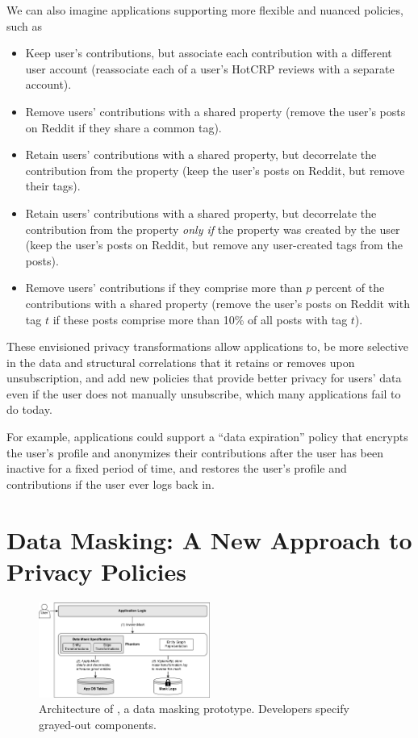We can also imagine applications supporting more flexible and nuanced policies, such as
\begin{itemize}[nosep]
    \item Keep user's contributions, but associate each contribution with a different user account
        (\eg reassociate each of a user's HotCRP reviews with a separate account).
    \item Remove users' contributions with a shared property (\eg remove the user's
       posts on Reddit if they share a common tag).
    \item Retain users' contributions with a shared property, but decorrelate the contribution
        from the property (\eg keep the user's posts on Reddit, but remove their tags).
    \item Retain users' contributions with a shared property, but decorrelate the contribution
        from the property \emph{only if} the property was created by
        the user (\eg keep the user's posts on Reddit, but remove any user-created tags from the posts).
    \item Remove users' contributions if they comprise more than $p$ percent of the contributions
        with a shared property (\eg remove the user's posts on Reddit with tag $t$ if
        these posts comprise more than 10\% of all posts with tag $t$).
\end{itemize}

These envisioned privacy transformations allow applications to, \eg be more selective in the data and structural
correlations that it retains or removes upon unsubscription, and add new policies that provide
better privacy for users' data even if the user does not manually unsubscribe, which many applications
fail to do today.

For example, applications could support a ``data expiration'' policy that encrypts the user's
profile and anonymizes their contributions after the user has been inactive for a fixed period of
time, and restores the user's profile and contributions if the user ever logs back in.

\section{Data Masking: A New Approach to Privacy Policies}
\begin{figure}[t!]
    \centering
    \includegraphics[width=0.5\textwidth]{img/impl}

    \caption{Architecture of \sys, a data masking prototype. Developers specify grayed-out components.}
    \label{fig:arch}
\end{figure}

